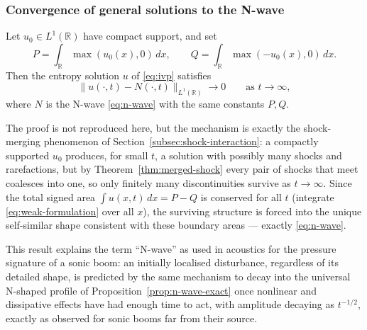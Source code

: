 \subsubsection{Convergence of general solutions to the N-wave}
\label{subsubsec:n-wave-convergence}

\begin{theorem}
\label{thm:n-wave-decay}
Let $u_0 \in L^1(\mathbb{R})$ have compact support, and set
\begin{equation}
  \label{eq:pq-areas}
  P = \int_{\mathbb{R}} \max(u_0(x),0)\, dx, \qquad
  Q = \int_{\mathbb{R}} \max(-u_0(x),0)\, dx.
\end{equation}
Then the entropy solution $u$ of \eqref{eq:ivp} satisfies
\begin{equation}
  \|u(\cdot,t) - N(\cdot,t)\|_{L^1(\mathbb{R})} \to 0 \qquad \text{as } t \to \infty,
\end{equation}
where $N$ is the N-wave \eqref{eq:n-wave} with the same constants $P,Q$.
\end{theorem}

The proof is not reproduced here, but the mechanism is exactly the
shock-merging phenomenon of Section~\ref{subsec:shock-interaction}: a
compactly supported $u_0$ produces, for small $t$, a solution with
possibly many shocks and rarefactions, but by
Theorem~\ref{thm:merged-shock} every pair of shocks that meet coalesces
into one, so only finitely many discontinuities survive as $t\to\infty$.
Since the total signed area $\int u(x,t)\,dx = P-Q$ is conserved for all
$t$ (integrate \eqref{eq:weak-formulation} over all $x$), the surviving
structure is forced into the unique self-similar shape consistent with
these boundary areas --- exactly \eqref{eq:n-wave}.

\begin{remark}
This result explains the term ``N-wave'' as used in acoustics for the
pressure signature of a sonic boom: an initially localised disturbance,
regardless of its detailed shape, is predicted by the same mechanism to
decay into the universal N-shaped profile of
Proposition~\ref{prop:n-wave-exact} once nonlinear and dissipative
effects have had enough time to act, with amplitude decaying as
$t^{-1/2}$, exactly as observed for sonic booms far from their source.
\end{remark}